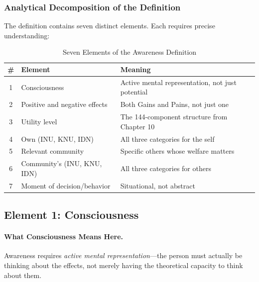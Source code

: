 \subsubsection{Analytical Decomposition of the Definition}

The definition contains seven distinct elements. Each requires precise understanding:

\begin{table}[htbp]
\centering
\caption{Seven Elements of the Awareness Definition}
\label{tab:awareness-elements}
\renewcommand{\arraystretch}{1.4}
\begin{tabular}{@{}clp{7cm}@{}}
\toprule
\textbf{\#} & \textbf{Element} & \textbf{Meaning} \\
\midrule
1 & Consciousness & Active mental representation, not just potential \\
2 & Positive and negative effects & Both Gains and Pains, not just one \\
3 & Utility level & The 144-component structure from Chapter 10 \\
4 & Own (INU, KNU, IDN) & All three categories for the self \\
5 & Relevant community & Specific others whose welfare matters \\
6 & Community's (INU, KNU, IDN) & All three categories for others \\
7 & Moment of decision/behavior & Situational, not abstract \\
\bottomrule
\end{tabular}
\end{table}

\subsection{Element 1: Consciousness}
\label{subsec:consciousness}

\paragraph{What Consciousness Means Here.}
Awareness requires \emph{active mental representation}---the person must 
actually be thinking about the effects, not merely having the theoretical 
capacity to think about them.

